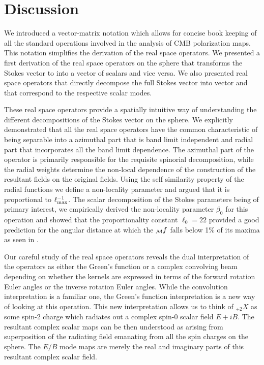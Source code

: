 \section{Discussion}\label{sec:discussion}

We introduced a vector-matrix notation which allows for concise book keeping of all the standard operations involved in the analysis of CMB polarization maps. This notation simplifies the derivation of the real space operators. We presented a first derivation of the real space operators on the sphere that transforms the Stokes vector \vp{} to into a vector of scalars \vs{} and vice versa. We also presented real space operators that directly decompose the full Stokes vector \vp{} into vector  and  that correspond to the respective scalar modes.

These real space operators provide a spatially intuitive way of understanding the different decompositions of the Stokes vector on the sphere. We explicitly  demonstrated that all the real space operators have the common characteristic  of being separable into a azimuthal part that is band limit independent and radial part that incorporates all the band limit dependence. The azimuthal part of the operator is primarily responsible for the requisite spinorial decomposition, while the radial weights determine the non-local dependence of the construction of the resultant fields on the original fields. Using the self similarity property of the radial functions we define a non-locality parameter and argued that it is proportional to $\ell_{\rm max}^{-1}$. The scalar decomposition of the Stokes parameters being of primary interest,  we empirically derived the non-locality parameter $\beta_0$ for this operation and showed that the proportionality constant $\ell_{0}=22$ provided a good prediction for the angular distance at which the ${}_{\mathcal{M}}f$ falls below 1\% of its maxima as seen in .

Our careful study of the real space operators reveals the dual interpretation of the operators as either the Green's function or a complex convolving beam depending on whether the kernels are expressed in terms of the forward rotation Euler angles or the inverse rotation Euler angles. While the convolution interpretation is a familiar one, the Green's function interpretation is a new way of looking at this operation. This new interpretation allows us to think of ${}_{+2}X$ as some spin-2 charge which radiates out a complex spin-0 scalar field $E+iB$. The resultant complex scalar maps can be then understood as arising from superposition of the radiating field emanating from all the spin charges on the sphere. The $E/B$ mode maps are merely the real and imaginary parts of this resultant complex scalar field.

